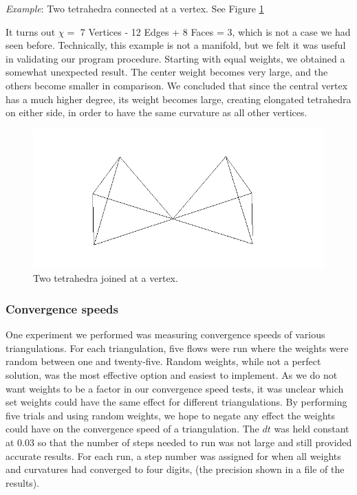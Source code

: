 \documentclass[12pt]{article}
\begin{document}
 \textit{Example}: Two tetrahedra connected at a vertex. See Figure \ref{fig:tt}

 It turns out $\chi = $ 7 Vertices - 12 Edges + 8 Faces = 3, which is not a case we had seen before. Technically, this example is not a manifold, but we felt it was useful in validating our program procedure. Starting with equal weights, we obtained a somewhat unexpected result. The center weight becomes very large, and the others become smaller in comparison. We concluded that since the central vertex has a much higher degree, its weight becomes large, creating elongated tetrahedra on either side, in order to have the same curvature as all other vertices.

\begin{figure}
\includegraphics{Pictures/tetratouch.png}
\caption{Two tetrahedra joined at a vertex.}
\label{fig:tt}
\end{figure}

\subsubsection{Convergence speeds}

One experiment we performed was measuring convergence speeds of various triangulations. For each triangulation, five flows were run where the weights were random between one and twenty-five. Random weights, while not a perfect solution, was the most effective option and easiest to implement. As we do not want weights to be a factor in our convergence speed tests, it was unclear which set weights could have the same effect for different triangulations. By performing five trials and using random weights, we hope to negate any effect the weights could have on the convergence speed of a triangulation. The $dt$ was held constant at 0.03 so that the number of steps needed to run was not large and still provided accurate results. For each run, a step number was assigned for when all weights and curvatures had converged to four digits, (the precision shown in a file of the results).
\end{document}
